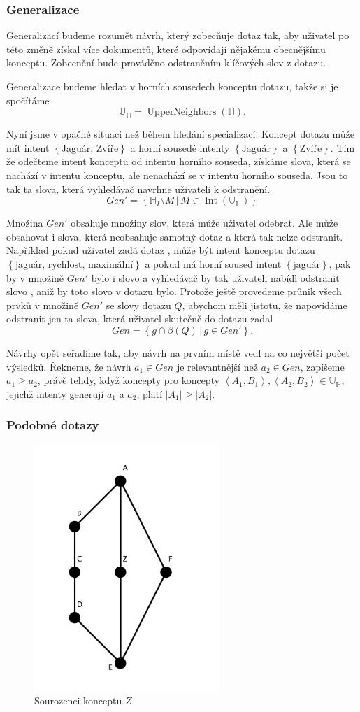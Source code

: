 \documentclass[12pt]{article}
\newcommand{\sep}{\,|\,}
\newcommand{\sssection}[1]{\subsubsection{#1}}
\newcommand{\adds}[1]{\left\{#1\right\}}
\newcommand{\addsp}[1]{\left<#1\right>}
\DeclareMathOperator{\intfca}{Int}
\DeclareMathOperator{\upperneighbors}{UpperNeighbors}
\newcommand{\hledany}{\mathbb{H}}
\newcommand{\upperc}{\mathbb{U}}
\begin{document}
\sssection{Generalizace}
Generalizací budeme rozumět návrh, který zobecňuje dotaz tak, aby uživatel po této změně získal více dokumentů, které odpovídají nějakému obecnějšímu konceptu. Zobecnění bude prováděno odstraněním klíčových slov z dotazu. 

Generalizace budeme hledat v horních sousedech konceptu dotazu, takže si je spočítáme
$$
\upperc_\hledany=\upperneighbors(\hledany).
$$

Nyní jsme v opačné situaci než během hledání specializací. Koncept dotazu může mít intent $\adds{\mbox{Jaguár, Zvíře}}$ a horní sousedé intenty $\adds{\mbox{Jaguár}}$ a $\adds{\mbox{Zvíře}}$. Tím že odečteme intent konceptu od intentu horního souseda, získáme slova, která se nachází v intentu konceptu, ale nenachází se v intentu horního souseda. Jsou to tak ta slova, která vyhledávač navrhne uživateli k odstranění. 
$$
Gen'=\adds{\hledany_I\setminus M\sep M\in\intfca(\upperc_\hledany)}
$$

Množina $Gen'$ obsahuje množiny slov, která může uživatel odebrat. Ale může obsahovat i slova, která neobsahuje samotný dotaz a která tak nelze odstranit. Například pokud uživatel zadá dotaz , může být intent konceptu dotazu $\adds{\mbox{jaguár, rychlost, maximální}}$ a pokud má horní soused intent $\adds{\mbox{jaguár}}$, pak by v množině $Gen'$ bylo i slovo  a vyhledávač by tak uživateli nabídl odstranit slovo , aniž by toto slovo v dotazu bylo. Protože ještě provedeme průnik všech prvků v množině $Gen'$ se slovy dotazu $Q$, abychom měli jistotu, že napovídáme odstranit jen ta slova, která uživatel skutečně do dotazu zadal
$$
Gen=\adds{g\cap\beta(Q)\sep g\in Gen'}.
$$

Návrhy opět seřadíme tak, aby návrh na prvním místě vedl na co největší počet výsledků. Řekneme, že návrh $a_1\in Gen$ je relevantnější než $a_2\in Gen$, zapíšeme $a_1\ge a_2$, právě tehdy, když koncepty pro koncepty $\addsp{A_1, B_1}, \addsp{A_2, B_2} \in \upperc_\hledany$, jejichž intenty generují $a_1$ a $a_2$, platí $|A_1|\ge|A_2|$. 

\sssection{Podobné dotazy}
\begin{figure}
  \centering
  \includegraphics[width=7cm]{obrazky/siblings.pdf}
  \caption{Sourozenci konceptu $Z$}
  \label{fig.siblings}
\end{figure}
\end{document}
